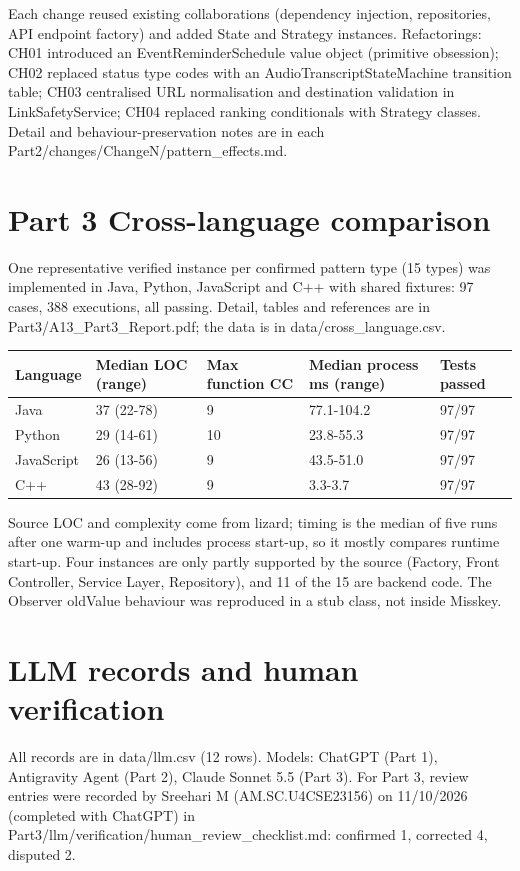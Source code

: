 \documentclass[11pt,a4paper]{article}
\begin{document}
Each change reused existing collaborations (dependency injection, repositories, API endpoint factory) and added State and Strategy instances. Refactorings: CH01 introduced an EventReminderSchedule value object (primitive obsession); CH02 replaced status type codes with an AudioTranscriptStateMachine transition table; CH03 centralised URL normalisation and destination validation in LinkSafetyService; CH04 replaced ranking conditionals with Strategy classes. Detail and behaviour-preservation notes are in each Part2/changes/ChangeN/pattern\_effects.md.

\section{Part 3 Cross-language comparison}
One representative verified instance per confirmed pattern type (15 types) was implemented in Java, Python, JavaScript and C++ with shared fixtures: 97 cases, 388 executions, all passing. Detail, tables and references are in Part3/A13\_Part3\_Report.pdf; the data is in data/cross\_language.csv.

{\small\begin{tabularx}{\linewidth}{llllX}\toprule
Language & Median LOC (range) & Max function CC & Median process ms (range) & Tests passed\\\midrule
Java & 37 (22-78) & 9 & 77.1-104.2 & 97/97 \\
Python & 29 (14-61) & 10 & 23.8-55.3 & 97/97 \\
JavaScript & 26 (13-56) & 9 & 43.5-51.0 & 97/97 \\
C++ & 43 (28-92) & 9 & 3.3-3.7 & 97/97\\
\bottomrule\end{tabularx}}

Source LOC and complexity come from lizard; timing is the median of five runs after one warm-up and includes process start-up, so it mostly compares runtime start-up. Four instances are only partly supported by the source (Factory, Front Controller, Service Layer, Repository), and 11 of the 15 are backend code. The Observer oldValue behaviour was reproduced in a stub class, not inside Misskey.

\section{LLM records and human verification}
All records are in data/llm.csv (12 rows). Models: ChatGPT (Part 1), Antigravity Agent (Part 2), Claude Sonnet 5.5 (Part 3). For Part 3, review entries were recorded by Sreehari M (AM.SC.U4CSE23156) on 11/10/2026 (completed with ChatGPT) in Part3/llm/verification/human\_review\_checklist.md: confirmed 1, corrected 4, disputed 2.
\end{document}
